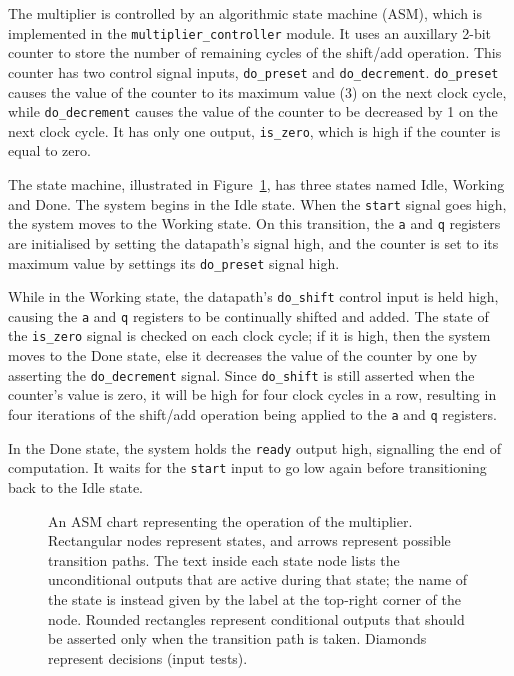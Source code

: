\documentclass[a4paper]{article}
\begin{document}
The multiplier is controlled by an algorithmic state machine (ASM), which is implemented in the \texttt{multiplier\_controller} module. It uses an auxillary 2-bit counter to store the number of remaining cycles of the shift/add operation. This counter has two control signal inputs, \texttt{do\_preset} and \texttt{do\_decrement}. \texttt{do\_preset} causes the value of the counter to its maximum value (3) on the next clock cycle, while \texttt{do\_decrement} causes the value of the counter to be decreased by 1 on the next clock cycle. It has only one output, \texttt{is\_zero}, which is high if the counter is equal to zero.

The state machine, illustrated in Figure~\ref{fig:asm}, has three states named Idle, Working and Done. The system begins in the Idle state. When the \texttt{start} signal goes high, the system moves to the Working state. On this transition, the \texttt{a} and \texttt{q} registers are initialised by setting the datapath's  signal high, and the counter is set to its maximum value by settings its \texttt{do\_preset} signal high.

While in the Working state, the datapath's \texttt{do\_shift} control input is held high, causing the \texttt{a} and \texttt{q} registers to be continually shifted and added. The state of the \texttt{is\_zero} signal is checked on each clock cycle; if it is high, then the system moves to the Done state, else it decreases the value of the counter by one by asserting the \texttt{do\_decrement} signal. Since \texttt{do\_shift} is still asserted when the counter's value is zero, it will be high for four clock cycles in a row, resulting in four iterations of the shift/add operation being applied to the \texttt{a} and \texttt{q} registers.

In the Done state, the system holds the \texttt{ready} output high, signalling the end of computation. It waits for the \texttt{start} input to go low again before transitioning back to the Idle state.

\begin{figure}[tbp]
  \centering
  
  \caption{An ASM chart representing the operation of the multiplier. Rectangular nodes represent states, and arrows represent possible transition paths. The text inside each state node lists the unconditional outputs that are active during that state; the name of the state is instead given by the label at the top-right corner of the node. Rounded rectangles represent conditional outputs that should be asserted only when the transition path is taken. Diamonds represent decisions (input tests).}
  \label{fig:asm}
\end{figure}
\end{document}

